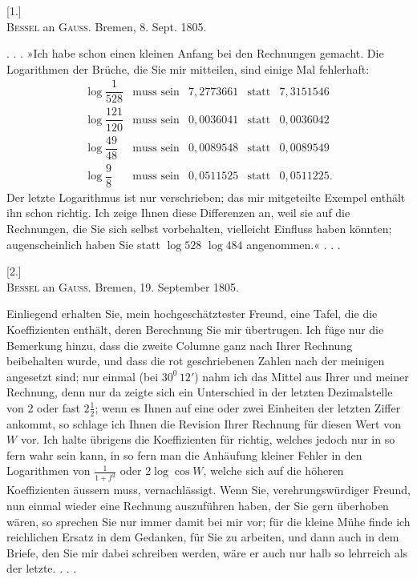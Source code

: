 \clearpage\begingroup{}
\renewcommand{\thefootnote}{\arabic{footnote})}\setcounter{footnote}{0}
\begin{center}\end{center}
\begin{center}[1.]\\[3pt]
\textsc{Bessel} an \textsc{Gauss}. Bremen, 8. Sept. 1805.\end{center}
\noindent\hspace*{\parindent}. . . »Ich habe schon einen kleinen Anfang bei den Rechnungen gemacht.
Die Logarithmen der Brüche, die Sie mir mitteilen, sind einige Mal fehlerhaft:
\[
\begin{array}{rclcl}
\log\dfrac{1}{528}&\text{muss sein}&7{,}2773661&\text{statt}&7{,}3151546\\[5pt]
\log\dfrac{121}{120}&\text{muss sein}&0{,}0036041&\text{statt}&0{,}0036042\\[5pt]
\log\dfrac{49}{48}&\text{muss sein}&0{,}0089548&\text{statt}&0{,}0089549\\[5pt]
\log\dfrac{9}{8}&\text{muss sein}&0{,}0511525&\text{statt}&0{,}0511225.
\end{array}
\]
\clearpage{}
\noindent\hspace*{\parindent}Der letzte Logarithmus ist nur verschrieben; das mir mitgeteilte Exempel
enthält ihn schon richtig. Ich zeige Ihnen diese Differenzen an, weil sie auf
die Rechnungen, die Sie sich selbst vorbehalten, vielleicht Einfluss haben
könnten; augenscheinlich haben Sie statt $\log 528$ $\log 484$ angenommen.« . . .
\begin{center}[2.]\\[3pt]
\textsc{Bessel} an \textsc{Gauss}. Bremen, 19. September 1805.\end{center}
\noindent\hspace*{\parindent}Einliegend erhalten Sie, mein hochgeschätztester Freund, eine Tafel, die
die Koeffizienten enthält, deren Berechnung Sie mir übertrugen. Ich füge
nur die Bemerkung hinzu, dass die zweite Columne ganz nach Ihrer Rechnung
beibehalten wurde, und dass die rot geschriebenen Zahlen nach der meinigen
angesetzt sind; nur einmal (bei $30^0\,12'$) nahm ich das Mittel aus Ihrer und
meiner Rechnung, denn nur da zeigte sich ein Unterschied in der letzten
Dezimalstelle von 2 oder fast $2\frac{1}{2}$; wenn es Ihnen auf eine oder zwei Einheiten
der letzten Ziffer ankommt, so schlage ich Ihnen die Revision Ihrer
Rechnung für diesen Wert von $W$ vor. Ich halte übrigens die Koeffizienten
für richtig, welches jedoch nur in so fern wahr sein kann, in so fern man
die Anhäufung kleiner Fehler in den Logarithmen von $\frac{1}{1+f^2}$ oder $2\log\cos W$,
welche sich auf die höheren Koeffizienten äussern muss, vernachlässigt. Wenn
Sie, verehrungswürdiger Freund, nun einmal wieder eine Rechnung auszuführen
haben, der Sie gern überhoben wären, so sprechen Sie nur immer
damit bei mir vor; für die kleine Mühe finde ich reichlichen Ersatz in dem
Gedanken, für Sie zu arbeiten, und dann auch in dem Briefe, den Sie mir
dabei schreiben werden, wäre er auch nur halb so lehrreich als der letzte. . . .

